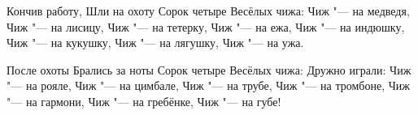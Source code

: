 \noindent\hspace*{5cm}%
\begin{minipage}[t]{\dimexpr\linewidth-5cm}
                Кончив работу, \newline 
                Шли на охоту \newline
               Сорок четыре \newline
               Весёлых чижа: \newline
               Чиж "--- на медведя, \newline
               Чиж "--- на лисицу, \newline
               Чиж "--- на тетерку, \newline
               Чиж "--- на ежа, \newline
               Чиж "--- на индюшку, \newline
               Чиж "--- на кукушку, \newline
               Чиж "--- на лягушку, \newline
               Чиж "--- на ужа. \newline
\end{minipage}

\noindent\hspace*{6cm}%
\begin{minipage}[t]{\dimexpr\linewidth-6cm}
               После охоты \newline
               Брались за ноты \newline
               Сорок четыре \newline
               Весёлых чижа: \newline
               Дружно играли: \newline
               Чиж "--- на рояле, \newline
               Чиж "--- на цимбале, \newline
               Чиж "--- на трубе, \newline
               Чиж "--- на тромбоне, \newline
               Чиж "--- на гармони, \newline
               Чиж "--- на гребёнке, \newline
               Чиж "--- на губе! \newline
\end{minipage}

